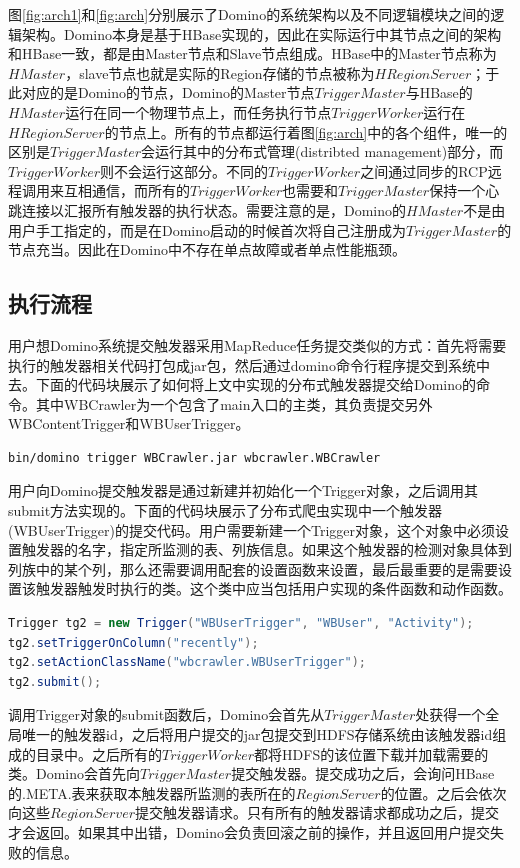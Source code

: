 图\ref{fig:arch1}和\ref{fig:arch}分别展示了Domino的系统架构以及不同逻辑模块之间的逻辑架构。Domino本身是基于HBase实现的，因此在实际运行中其节点之间的架构和HBase一致，都是由Master节点和Slave节点组成。HBase中的Master节点称为$HMaster$，slave节点也就是实际的Region存储的节点被称为$HRegionServer$；于此对应的是Domino的节点，Domino的Master节点$TriggerMaster$与HBase的$HMaster$运行在同一个物理节点上，而任务执行节点$TriggerWorker$运行在$HRegionServer$的节点上。所有的节点都运行着图\ref{fig:arch}中的各个组件，唯一的区别是$TriggerMaster$会运行其中的分布式管理(distribted management)部分，而$TriggerWorker$则不会运行这部分。不同的$TriggerWorker$之间通过同步的RCP远程调用来互相通信，而所有的$TriggerWorker$也需要和$TriggerMaster$保持一个心跳连接以汇报所有触发器的执行状态。需要注意的是，Domino的$HMaster$不是由用户手工指定的，而是在Domino启动的时候首次将自己注册成为$TriggerMaster$的节点充当。因此在Domino中不存在单点故障或者单点性能瓶颈。

\subsection{执行流程}
用户想Domino系统提交触发器采用MapReduce任务提交类似的方式：首先将需要执行的触发器相关代码打包成jar包，然后通过domino命令行程序提交到系统中去。下面的代码块展示了如何将上文中实现的分布式触发器提交给Domino的命令。其中WBCrawler为一个包含了main入口的主类，其负责提交另外WBContentTrigger和WBUserTrigger。
\begin{lstlisting}[language=bash]
	bin/domino trigger WBCrawler.jar wbcrawler.WBCrawler
\end{lstlisting}

用户向Domino提交触发器是通过新建并初始化一个Trigger对象，之后调用其submit方法实现的。下面的代码块展示了分布式爬虫实现中一个触发器(WBUserTrigger)的提交代码。用户需要新建一个Trigger对象，这个对象中必须设置触发器的名字，指定所监测的表、列族信息。如果这个触发器的检测对象具体到列族中的某个列，那么还需要调用配套的设置函数来设置，最后最重要的是需要设置该触发器触发时执行的类。这个类中应当包括用户实现的条件函数和动作函数。

\begin{lstlisting}[language=java]
Trigger tg2 = new Trigger("WBUserTrigger", "WBUser", "Activity");
tg2.setTriggerOnColumn("recently");
tg2.setActionClassName("wbcrawler.WBUserTrigger");
tg2.submit();
\end{lstlisting}

调用Trigger对象的submit函数后，Domino会首先从$TriggerMaster$处获得一个全局唯一的触发器id，之后将用户提交的jar包提交到HDFS存储系统由该触发器id组成的目录中。之后所有的$TriggerWorker$都将HDFS的该位置下载并加载需要的类。Domino会首先向$TriggerMaster$提交触发器。提交成功之后，会询问HBase的.META.表来获取本触发器所监测的表所在的$RegionServer$的位置。之后会依次向这些$RegionServer$提交触发器请求。只有所有的触发器请求都成功之后，提交才会返回。如果其中出错，Domino会负责回滚之前的操作，并且返回用户提交失败的信息。


